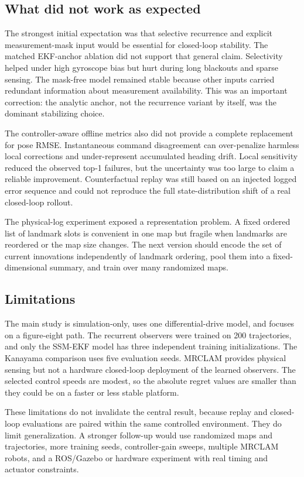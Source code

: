 \documentclass[11pt]{article}
\begin{document}
\subsection{What did not work as expected}
The strongest initial expectation was that selective recurrence and explicit measurement-mask input would be essential for closed-loop stability. The matched EKF-anchor ablation did not support that general claim. Selectivity helped under high gyroscope bias but hurt during long blackouts and sparse sensing. The mask-free model remained stable because other inputs carried redundant information about measurement availability. This was an important correction: the analytic anchor, not the recurrence variant by itself, was the dominant stabilizing choice.

The controller-aware offline metrics also did not provide a complete replacement for pose RMSE. Instantaneous command disagreement can over-penalize harmless local corrections and under-represent accumulated heading drift. Local sensitivity reduced the observed top-1 failures, but the uncertainty was too large to claim a reliable improvement. Counterfactual replay was still based on an injected logged error sequence and could not reproduce the full state-distribution shift of a real closed-loop rollout.

The physical-log experiment exposed a representation problem. A fixed ordered list of landmark slots is convenient in one map but fragile when landmarks are reordered or the map size changes. The next version should encode the set of current innovations independently of landmark ordering, pool them into a fixed-dimensional summary, and train over many randomized maps.

\subsection{Limitations}
The main study is simulation-only, uses one differential-drive model, and focuses on a figure-eight path. The recurrent observers were trained on 200 trajectories, and only the SSM-EKF model has three independent training initializations. The Kanayama comparison uses five evaluation seeds. MRCLAM provides physical sensing but not a hardware closed-loop deployment of the learned observers. The selected control speeds are modest, so the absolute regret values are smaller than they could be on a faster or less stable platform.

These limitations do not invalidate the central result, because replay and closed-loop evaluations are paired within the same controlled environment. They do limit generalization. A stronger follow-up would use randomized maps and trajectories, more training seeds, controller-gain sweeps, multiple MRCLAM robots, and a ROS/Gazebo or hardware experiment with real timing and actuator constraints.
\end{document}
